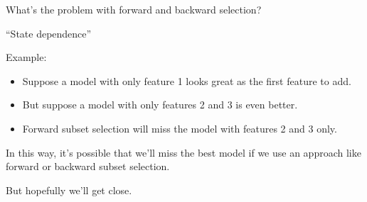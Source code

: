 \documentclass[mathserif, aspectratio=169]{beamer}
\begin{document}
\begin{frame}{What's the problem with forward and backward selection?}

\pause

``State dependence''
\vspace{5mm}

Example: 
\begin{itemize}
	\item Suppose a model with only feature 1 looks great as the first feature to add.  
	\item But suppose a model with only features 2 and 3 is even better.  
	\item Forward subset selection will miss the model with features 2 and 3 only.  
\end{itemize}

In this way, it's possible that we'll miss the best model if we use an approach like forward or backward subset selection.

\vspace{5mm}

But hopefully we'll get close.

\end{frame}
\end{document}
